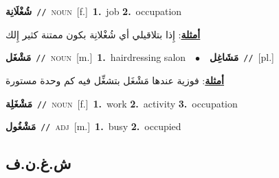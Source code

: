 \documentclass[10pt,a4paper,twoside]{article} %
\begin{document}
\begin{multicols}{2}
{\setlength\topsep{0pt}\textbf{\foreignlanguage{arabic}{شُغْلَانِة}}\ {\color{gray}\texttt{//}\color{black}}\ \textsc{noun}\ [f.]\ \textbf{1.}~job  \textbf{2.}~occupation\  \begin{flushright}\color{gray}\foreignlanguage{arabic}{\textbf{\underline{\foreignlanguage{arabic}{أمثلة}}}: إِذا بتلاقيلي أي شُغْلانِة بكون ممتنة كثير إِلك}\end{flushright}\color{black}} \vspace{2mm}

{\setlength\topsep{0pt}\textbf{\foreignlanguage{arabic}{مَشْغَل}}\ {\color{gray}\texttt{//}\color{black}}\ \textsc{noun}\ [m.]\ \textbf{1.}~hairdressing salon\ \ $\bullet$\ \ \setlength\topsep{0pt}\textbf{\foreignlanguage{arabic}{مَشَاغِل}}\ {\color{gray}\texttt{//}\color{black}}\ [pl.]\  \begin{flushright}\color{gray}\foreignlanguage{arabic}{\textbf{\underline{\foreignlanguage{arabic}{أمثلة}}}: فوزية عندها مَشْغَل بتشغِّل فيه كم وحدة مستورة}\end{flushright}\color{black}} \vspace{2mm}

{\setlength\topsep{0pt}\textbf{\foreignlanguage{arabic}{مَشْغَلِة}}\ {\color{gray}\texttt{//}\color{black}}\ \textsc{noun}\ [f.]\ \textbf{1.}~work  \textbf{2.}~activity  \textbf{3.}~occupation\ } \vspace{2mm}

{\setlength\topsep{0pt}\textbf{\foreignlanguage{arabic}{مَشْغُول}}\ {\color{gray}\texttt{//}\color{black}}\ \textsc{adj}\ [m.]\ \textbf{1.}~busy  \textbf{2.}~occupied\ } \vspace{2mm}

\vspace{-3mm}
\subsection*{\color{blue}\foreignlanguage{arabic}{ش.غ.ن.ف}\color{blue}{}} 


\end{multicols}
\end{document}
